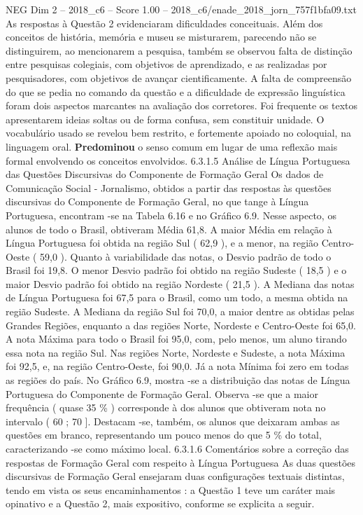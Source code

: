 \begin{textsample}{NEG Dim 2 – 2018\_c6 – Score 1.00 – 2018\_c6/enade\_2018\_jorn\_757f1bfa09.txt}
As respostas à Questão 2 evidenciaram dificuldades conceituais.
Além dos conceitos de história, memória e museu se misturarem, parecendo não se distinguirem, ao mencionarem a pesquisa, também se observou falta de distinção entre pesquisas colegiais, com objetivos de aprendizado, e as realizadas por pesquisadores, com objetivos de avançar cientificamente.
A falta de compreensão do que se pedia no comando da questão e a dificuldade de expressão linguística foram dois aspectos marcantes na avaliação dos corretores.
Foi frequente os textos apresentarem ideias soltas ou de forma confusa, sem constituir unidade.
O vocabulário usado se revelou bem restrito, e fortemente apoiado no coloquial, na linguagem oral. \textbf{Predominou} o senso comum em lugar de uma reflexão mais formal envolvendo os conceitos envolvidos. 6.3.1.5 Análise de Língua Portuguesa das Questões Discursivas do Componente de Formação Geral Os dados de Comunicação Social - Jornalismo, obtidos a partir das respostas às questões discursivas do Componente de Formação Geral, no que tange à Língua Portuguesa, encontram -se na Tabela 6.16 e no Gráfico 6.9.
Nesse aspecto, os alunos de todo o Brasil, obtiveram Média 61,8.
A maior Média em relação à Língua Portuguesa foi obtida na região Sul ( 62,9 ), e a menor, na região Centro-Oeste ( 59,0 ).
Quanto à variabilidade das notas, o Desvio padrão de todo o Brasil foi 19,8.
O menor Desvio padrão foi obtido na região Sudeste ( 18,5 ) e o maior Desvio padrão foi obtido na região Nordeste ( 21,5 ).
A Mediana das notas de Língua Portuguesa foi 67,5 para o Brasil, como um todo, a mesma obtida na região Sudeste.
A Mediana da região Sul foi 70,0, a maior dentre as obtidas pelas Grandes Regiões, enquanto a das regiões Norte, Nordeste e Centro-Oeste foi 65,0.
A nota Máxima para todo o Brasil foi 95,0, com, pelo menos, um aluno tirando essa nota na região Sul.
Nas regiões Norte, Nordeste e Sudeste, a nota Máxima foi 92,5, e, na região Centro-Oeste, foi 90,0.
Já a nota Mínima foi zero em todas as regiões do país.
No Gráfico 6.9, mostra -se a distribuição das notas de Língua Portuguesa do Componente de Formação Geral.
Observa -se que a maior frequência ( quase 35 \% ) corresponde à dos alunos que obtiveram nota no intervalo ( 60 ; 70 ].
Destacam -se, também, os alunos que deixaram ambas as questões em branco, representando um pouco menos do que 5 \% do total, caracterizando -se como máximo local. 6.3.1.6 Comentários sobre a correção das respostas de Formação Geral com respeito à Língua Portuguesa As duas questões discursivas de Formação Geral ensejaram duas configurações textuais distintas, tendo em vista os seus encaminhamentos : a Questão 1 teve um caráter mais opinativo e a Questão 2, mais expositivo, conforme se explicita a seguir.

\end{textsample}
